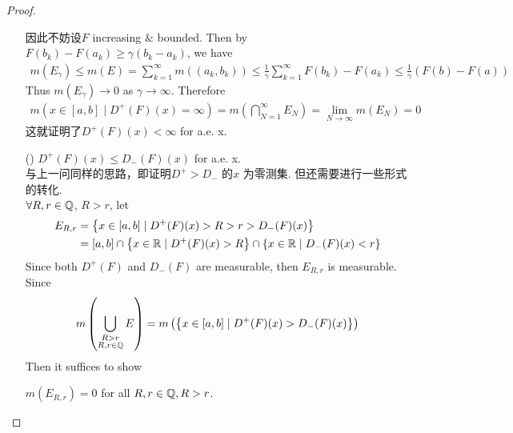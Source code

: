 \begin{thm}
\begin{proof}
\begin{enumerate}
				因此不妨设$F$ increasing $\&$ bounded. Then by $F(b_k) - F(a_k) \geq \gamma(b_k - a_k)$, we have
				\begin{align}
					m(E_\gamma) 
					\leq m(E)
					= \sum_{k = 1}^{\infty}{m\left( (a_k , b_k) \right)}
					\leq \frac{1}{\gamma} \sum_{k = 1}^{\infty}{F(b_k) - F(a_k)}
					\leq \frac{1}{\gamma} \left( F(b) - F(a) \right)
				\end{align}
				Thus $m(E_\gamma) \to 0$ as $\gamma \to \infty$. Therefore
				\begin{align}
					m\left( x \in [a , b] \mid D^{+}(F)(x) = \infty \right)
					= m\left( \bigcap_{N = 1}^{\infty}{E_N} \right)
					= \lim_{N \to \infty}{m(E_N)}
					= 0
				\end{align}
				这就证明了$D^{+}(F)(x) < \infty$ for a.e. x.
				
				\newpage
				
				\item[(\rmnum{2})]$D^{+}(F)(x) \leq D_{-}(F)(x)$ for a.e. x. \\
				与上一问同样的思路，即证明$D^{+} > D_{-}$ 的$x$ 为零测集. 但还需要进行一些形式的转化. \\
				$\forall R , r \in \mathbb{Q}$, $R > r$, let
				\begin{align}
					E_{R , r} 
					&= \left\{ x \in [a , b] \mid D^{+}(F)(x) > R > r > D_{-}(F)(x) \right\} \\
					&= [a , b] \cap \left\{ x \in \mathbb{R} \mid D^{+}(F)(x) > R \right\} \cap \left\{ x \in \mathbb{R} \mid D_{-}(F)(x) < r \right\}
				\end{align}
				Since both $D^{+}(F)$ and $D_{-}(F)$ are measurable, then $E_{R , r}$ is measurable. \\
				Since
				\begin{align}
					m\left( \bigcup_{\substack{R > r \\ R , r \in \mathbb{Q}}}{E} \right)
					= m\left( \left\{ x \in [a , b] \mid D^{+}(F)(x) > D_{-}(F)(x) \right\} \right)
				\end{align}
				Then it suffices to show 
				\begin{center}
					$m(E_{R , r}) = 0$ for all $R , r \in \mathbb{Q} , R > r$.
				\end{center}
				

\end{enumerate}
\end{proof}
\end{thm}
